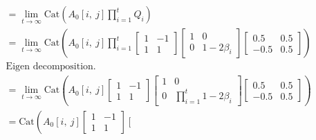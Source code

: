 \documentclass[
  11pt,
  letterpaper,
]{article}
\begin{document}
\begin{itemize}
\begin{itemize}
\begin{align*}
          &= \lim_{t \to \infty} \text{Cat}\left(A_0[i, \ j] \prod_{i=1}^t Q_i \right) \\
          &= \lim_{t \to \infty} \text{Cat}
          \left(A_0[i, \ j] 
              \prod_{i=1}^t  
              \left[
              \begin{matrix}
                  1  & -1 \\
                  1 & 1
              \end{matrix}
              \right]
              \left[
              \begin{matrix}
                  1  &  0 \\
                  0 & 1-2\beta_i
              \end{matrix}
              \right]
              \left[
              \begin{matrix}
                  0.5  &  0.5 \\
                  -0.5 & 0.5
              \end{matrix}
              \right]
          \right) \\ 
          &\text{Eigen decomposition.} \\ 
          &= \lim_{t \to \infty} \text{Cat}
          \left(A_0[i, \ j] 
              \left[
              \begin{matrix}
                  1  & -1 \\
                  1 & 1
              \end{matrix}
              \right]
              \left[
              \begin{matrix}
                  1  &  0 \\
                  0 & \prod_{i=1}^t 1-2\beta_i
              \end{matrix}
              \right]
              \left[
              \begin{matrix}
                  0.5  &  0.5 \\
                  -0.5 & 0.5
              \end{matrix}
              \right]
          \right) \\ 
          &= \text{Cat}
          \left(A_0[i, \ j] 
              \left[
              \begin{matrix}
                  1  & -1 \\
                  1 & 1
              \end{matrix}
              \right]
              \left[
              \begin{matrix}

\end{matrix}
\end{align*}
\end{itemize}
\end{itemize}
\end{document}
